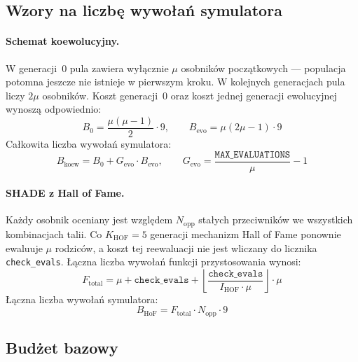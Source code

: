 \subsection{Wzory na liczbę wywołań symulatora}

\paragraph{Schemat koewolucyjny.}

W generacji~0 pula zawiera wyłącznie $\mu$ osobników początkowych --- populacja potomna jeszcze nie istnieje w pierwszym kroku. W kolejnych generacjach pula liczy $2\mu$ osobników. Koszt generacji~0 oraz koszt jednej generacji ewolucyjnej wynoszą odpowiednio:
\begin{equation}
    B_0 = \frac{\mu(\mu-1)}{2} \cdot 9, \qquad
    B_{\text{evo}} = \mu(2\mu - 1) \cdot 9
    \label{eq:bevo}
\end{equation}
Całkowita liczba wywołań symulatora:
\begin{equation}
    B_{\text{koew}} = B_0 + G_{\text{evo}} \cdot B_{\text{evo}},
    \qquad G_{\text{evo}} = \frac{\texttt{MAX\_EVALUATIONS}}{\mu} - 1
    \label{eq:btotal_ga}
\end{equation}

\paragraph{SHADE z Hall of Fame.}

Każdy osobnik oceniany jest względem $N_{\text{opp}}$ stałych przeciwników we wszystkich kombinacjach talii. Co $K_{\text{HOF}} = 5$ generacji mechanizm Hall of Fame ponownie ewaluuje $\mu$ rodziców, a koszt tej reewaluacji nie jest wliczany do licznika \texttt{check\_evals}. Łączna liczba wywołań funkcji przystosowania wynosi:
\begin{equation}
    F_{\text{total}} = \mu + \texttt{check\_evals}
    + \left\lfloor \frac{\texttt{check\_evals}}
      {I_{\text{HOF}} \cdot \mu} \right\rfloor \cdot \mu
    \label{eq:ftotal}
\end{equation}
Łączna liczba wywołań symulatora:
\begin{equation}
    B_{\text{HoF}} = F_{\text{total}} \cdot N_{\text{opp}} \cdot 9
    \label{eq:btotal_pure}
\end{equation}

\subsection{Budżet bazowy}

